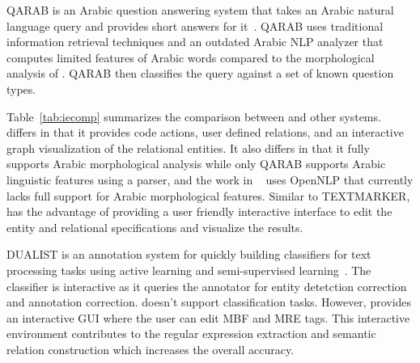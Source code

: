 QARAB is an Arabic question answering system that 
takes an Arabic natural language query and provides short answers for it~\cite{hammo2002qarab}. 
QARAB uses traditional information retrieval techniques and an outdated Arabic NLP 
analyzer that computes limited features of Arabic words compared 
to the morphological analysis of \framework. 
QARAB then classifies the query against a set of known question types. 

\begin{table}[tb!]
\caption{Comaprison of \framework with SystemT, 
TEXTMARKER, 
Urbain, 
QARAB}
\label{tab:iecomp}
\end{table}

Table~\ref{tab:iecomp} summarizes the comparison between \framework and
other systems. \framework differs in that it provides 
code actions, user defined relations, and an interactive 
graph visualization of the relational entities. 
It also differs in that it fully supports Arabic morphological analysis
while only QARAB supports Arabic linguistic features using a parser, and 
the work in ~\cite{urbain2012user} uses OpenNLP that currently lacks full
support for Arabic morphological features. 
Similar to TEXTMARKER, \framework has the advantage of providing 
a user friendly interactive interface to edit the entity and relational 
specifications and visualize the results. 

DUALIST is an annotation system for quickly building classifiers for 
text processing tasks using active learning and semi-supervised learning~\cite{settles2011closing}. 
The classifier is interactive as it queries the annotator 
for entity detetction correction and annotation correction. 
\framework doesn't support classification tasks. 
However, \framework provides an interactive GUI where the user can edit MBF and MRE tags. 
This interactive environment contributes to the regular expression 
extraction and semantic relation construction which increases the overall accuracy.

